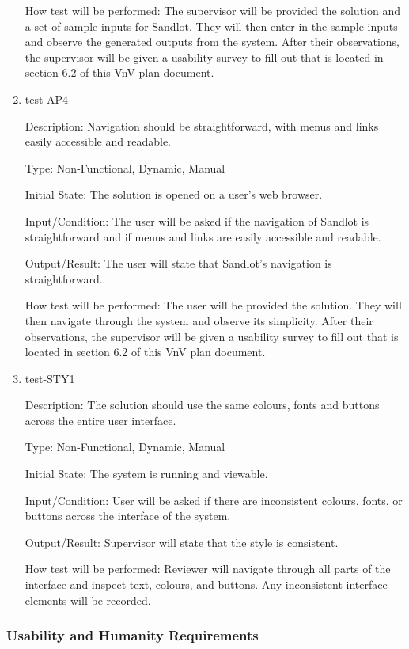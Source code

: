\documentclass[12pt, titlepage]{article}
\begin{document}
\begin{enumerate}
How test will be performed: The supervisor will be provided the solution and a set of
sample inputs for Sandlot. They will then enter in the sample inputs and observe the
generated outputs from the system. After their observations, the supervisor will be given
a usability survey to fill out that is located in section 6.2 of this VnV plan document.

\item{test-AP4\\}

Description: Navigation should be straightforward, with menus
and links easily accessible and readable.

Type: Non-Functional, Dynamic, Manual
					
Initial State: The solution is opened on a user's web browser.
					
Input/Condition: The user will be asked if the navigation of Sandlot is straightforward 
and if menus and links are easily accessible and readable.
					
Output/Result: The user will state that Sandlot's navigation is straightforward.
					
How test will be performed: The user will be provided the solution. They will then 
navigate through the system and observe its simplicity. After their observations, 
the supervisor will be given a usability survey to fill out that is located in 
section 6.2 of this VnV plan document.

\item{test-STY1\\}

Description: The solution should use the same colours, fonts
and buttons across the entire user interface.

Type: Non-Functional, Dynamic, Manual
					
Initial State: The system is running and viewable.
					
Input/Condition: User will be asked if there are inconsistent colours,
fonts, or buttons across the interface of the system.
					
Output/Result: Supervisor will state that the style is consistent.
					
How test will be performed: Reviewer will navigate through all parts
of the interface and inspect text, colours, and buttons. Any 
inconsistent interface elements will be recorded. 

\end{enumerate}

\subsubsection{Usability and Humanity Requirements}
\end{document}
